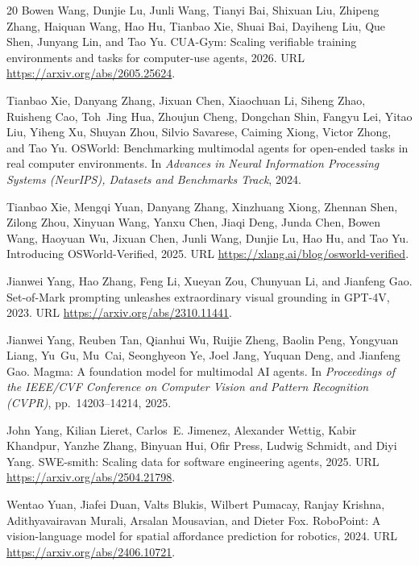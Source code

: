 \documentclass{article}
\begin{document}
\begin{thebibliography}{20}
Bowen Wang, Dunjie Lu, Junli Wang, Tianyi Bai, Shixuan Liu, Zhipeng Zhang, Haiquan Wang, Hao Hu, Tianbao Xie, Shuai Bai, Dayiheng Liu, Que Shen, Junyang Lin, and Tao Yu.
\newblock CUA-Gym: Scaling verifiable training environments and tasks for computer-use agents, 2026.
\newblock URL \url{https://arxiv.org/abs/2605.25624}.

Tianbao Xie, Danyang Zhang, Jixuan Chen, Xiaochuan Li, Siheng Zhao, Ruisheng Cao, Toh~Jing Hua, Zhoujun Cheng, Dongchan Shin, Fangyu Lei, Yitao Liu, Yiheng Xu, Shuyan Zhou, Silvio Savarese, Caiming Xiong, Victor Zhong, and Tao Yu.
\newblock OSWorld: Benchmarking multimodal agents for open-ended tasks in real computer environments.
\newblock In \emph{Advances in Neural Information Processing Systems (NeurIPS), Datasets and Benchmarks Track}, 2024.

Tianbao Xie, Mengqi Yuan, Danyang Zhang, Xinzhuang Xiong, Zhennan Shen, Zilong Zhou, Xinyuan Wang, Yanxu Chen, Jiaqi Deng, Junda Chen, Bowen Wang, Haoyuan Wu, Jixuan Chen, Junli Wang, Dunjie Lu, Hao Hu, and Tao Yu.
\newblock Introducing OSWorld-Verified, 2025.
\newblock URL \url{https://xlang.ai/blog/osworld-verified}.

Jianwei Yang, Hao Zhang, Feng Li, Xueyan Zou, Chunyuan Li, and Jianfeng Gao.
\newblock Set-of-Mark prompting unleashes extraordinary visual grounding in GPT-4V, 2023.
\newblock URL \url{https://arxiv.org/abs/2310.11441}.

Jianwei Yang, Reuben Tan, Qianhui Wu, Ruijie Zheng, Baolin Peng, Yongyuan Liang, Yu~Gu, Mu~Cai, Seonghyeon Ye, Joel Jang, Yuquan Deng, and Jianfeng Gao.
\newblock Magma: A foundation model for multimodal AI agents.
\newblock In \emph{Proceedings of the IEEE/CVF Conference on Computer Vision and Pattern Recognition (CVPR)}, pp.\ 14203--14214, 2025.

John Yang, Kilian Lieret, Carlos~E. Jimenez, Alexander Wettig, Kabir Khandpur, Yanzhe Zhang, Binyuan Hui, Ofir Press, Ludwig Schmidt, and Diyi Yang.
\newblock SWE-smith: Scaling data for software engineering agents, 2025.
\newblock URL \url{https://arxiv.org/abs/2504.21798}.

Wentao Yuan, Jiafei Duan, Valts Blukis, Wilbert Pumacay, Ranjay Krishna, Adithyavairavan Murali, Arsalan Mousavian, and Dieter Fox.
\newblock RoboPoint: A vision-language model for spatial affordance prediction for robotics, 2024.
\newblock URL \url{https://arxiv.org/abs/2406.10721}.


\end{thebibliography}
\end{document}
